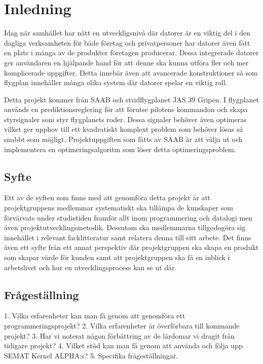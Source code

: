 \section{Inledning}
Idag när samhället har nått en utveckligsnivå där datorer är en viktig del i den dagliga verksamheten för både företag och privatpersoner har datorer även fått en plats i många av de produkter företagen producerar. Dessa integrerade datorer ger användaren en hjälpande hand för att denne ska kunna utföra fler och mer komplicerade uppgifter. Detta innebär även att avancerade konstruktioner så som flygplan innehåller många olika system där datorer spelar en viktig roll.

Detta projekt kommer från SAAB och stridflygplanet JAS 39 Gripen. I flygplanet används en prediktionsreglering för att förutse pilotens kommandon och skapa styrsignaler som styr flygplanets roder. Dessa signaler behöver även optimeras vilket ger upphov till ett kvadratiskt komplext problem som behöver lösas så snabbt som möjligt. Projektuppgiften som fåtts av SAAB är att välja ut och implementera en optimeringsalgoritm som löser detta optimeringsproblem.

\subsection{Syfte}
Ett av de syften som finns med att genomföra detta projekt är att projektgruppens medlemmar systematiskt ska tillämpa de kunskaper som förvärvats under studietiden framför allt inom programmering och datalogi men även projektutvecklingsmetodik. Dessutom ska medlemmarna tillgodogöra sig innehållet i relevant facklitteratur samt relatera denna till sitt arbete. 
Det finns även ett syfte från ett annat perspektiv där projektgruppen ska skapa en produkt som skapar värde för kunden samt att projektgruppen ska få en inblick i arbetslivet och hur en utvecklingsprocess kan se ut där.

\subsection{Frågeställning}
1. Vilka erfarenheter kan man få genom att genomföra ett programmeringsprojekt?
2. Vilka erfarenheter är överförbara till kommande projekt?
3. Har vi noterat någon förbättring av de lärdomar vi dragit från tidigare projekt?
4. Vilket stöd kan man få genom att använda och följa upp SEMAT Kernel ALPHA:s?
5. Specifika frågeställningar.




